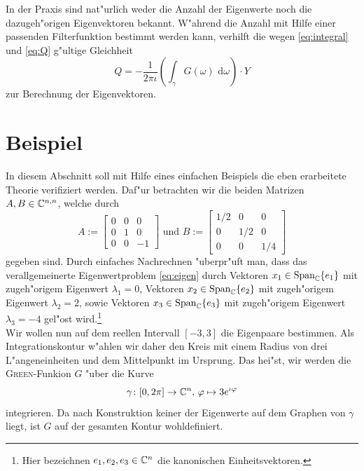 In der Praxis sind nat"urlich weder die Anzahl der Eigenwerte noch die dazugeh"origen Eigenvektoren
bekannt. W"ahrend die Anzahl mit Hilfe einer passenden Filterfunktion bestimmt werden kann,
verhilft die wegen \eqref{eq:integral} und \eqref{eq:Q} g"ultige Gleichheit
\begin{equation}\label{eq:solution}
Q = -\frac{1}{2\pi\iota}\left(\int_\gamma G(\omega)\text{ d}\omega\right)\cdot Y
\end{equation}
zur Berechnung der Eigenvektoren.

\newpage
\section{Beispiel}\label{sec:bsp}

In diesem Abschnitt soll mit Hilfe eines einfachen Beispiels die eben erarbeitete
Theorie verifiziert werden. Daf"ur betrachten wir die beiden Matrizen
$A,B \in \mathbb{C}^{n,n}$, welche durch
\[
A:= \begin{bmatrix} 0 & 0 & 0 \\ 0 & 1 & 0 \\ 0 & 0 & -1 \end{bmatrix} \text{ und }
B:= \begin{bmatrix} 1/2 & 0 & 0\\ 0 & 1/2 & 0 \\ 0 & 0 & 1/4 \end{bmatrix}
\]
gegeben sind. Durch einfaches Nachrechnen "uberpr"uft man, dass das
verallgemeinerte Eigenwertproblem \eqref{eq:eigen} durch Vektoren
$x_1 \in \text{Span}_{\mathbb{C}}\{e_1\}$ mit zugeh"origem Eigenwert $\lambda_1 = 0$, Vektoren
$x_2 \in \text{Span}_{\mathbb{C}}\{e_2\}$ mit zugeh"origem Eigenwert $\lambda_2 = 2$, sowie
Vektoren $x_3 \in\text{Span}_{\mathbb{C}}\{e_3\}$ mit zugeh"origem Eigenwert $\lambda_3 = -4$
gel"ost wird.\footnote{Hier bezeichnen $e_1, e_2, e_3 \in\mathbb{C}^n$ die kanonischen Einheitsvektoren.}\\

Wir wollen nun auf dem reellen Intervall $[-3,3]$ die Eigenpaare bestimmen.
Als Integrationskontur w"ahlen wir daher den Kreis mit einem Radius von drei
L"angeneinheiten und dem Mittelpunkt im Ursprung. Das hei"st, wir werden die
\textsc{Green}-Funkion $G$ "uber die Kurve
\begin{equation}\label{kurve}
\gamma\colon [0,2\pi]\to\mathbb{C}^n\text{, }\varphi\mapsto 3e^{\iota \varphi}
\end{equation}
integrieren. Da nach Konstruktion keiner der Eigenwerte auf dem
Graphen von $\gamma$ liegt, ist $G$ auf der gesamten Kontur wohldefiniert.

